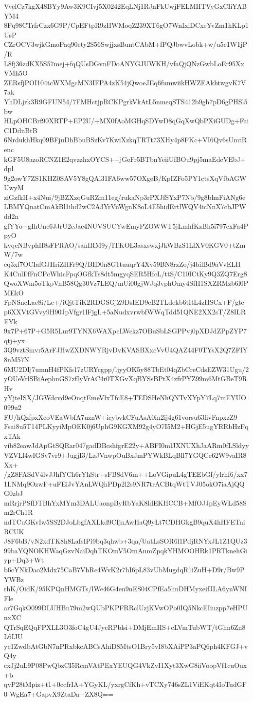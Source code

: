 VvelCz7kgX48BYy9Aw3K9CIvj5X0242EqLNj1RJnFkUwjFELMHTVyGxCIiYABYM4
8Fq98CTrfrCzx6G9P/CpEFtpR9zHWMoqZ239XT6gO7WnIxiDCxeYvZm1hKLp1UsP
CZrOCV3wjkGmoPaq90ety2S56SwjjxsBuntCAbM+fPQJbwvLobk+w/u5c1W1jP/R
L8fj36zdKX5S57mej+fqQUsDGvnFDoANYGJUWKH/vfaQjQNzGwbLoEr95XxVMh5O
ZERsfjPOI104tcWXMgcMN3IFPA4zK54jQwoeJEq6fumwiikHWZEAkhtwgvK7V7ak
YhDLjrk3R9GFUN54/7FMHctjpRCKPgrkVkAtL5nmeqSTS412b9gh7pD6gPHSl5bw
HLpOHCBrf90XRTP+EP2U/+MX0fAoMGHqSDYwD8qGqXwQbPXiGUDg+FaiC1DdnBtB
6NrdukhHkq09BFjuDhBbuBSzKv7KwiXzkqTRTt73XHy4p8FKc+VI6Qv6sUmtRenc
kGF5U8azoRCNZ1E2qvzzhxOYCS++jGeFr5BTbnYeiiUfBOu9pj5maEdcVEbJ+dpl
9g2owY7ZS1KHZ0SAV5Y8gQAl31FA6ww57OXgeB/KpIZFo5PY1ctsXqVfbAGWUwyM
ziGzfkH+x4Nui/9jBZXzqGuRZm11eg/rukaNp3rPXJfSYxP7Nb/9g8blmFiANg6e
LBMYQnatCmAkBl1ihd2wC2A3YrVnWgnK8oL4E5hidErtlWQV4icNnX7cbJPWdd2n
gfYYo+gIhUnc6JJrU2cJae4NUVSUCYwEmyPZOWWT5jLmhfKzBh5i797exFa4PpyO
kvqeNBvphH8sFPRAO/sanIRM9y/ITKOL3asxswxjJkWBzS1LlXV0KGV0+tZmW/7w
eq3xf7OCIafGJHriZHFr9Q/BID0n8G1tuuqrY4Xv59BN8rzZo/j4bilBd9aVvELH
K4CulFfFnCPcWhicFpqOGfkTs8dt5mgyqSER5HfcL/ttS/C10ICtKy9Q3ZQ7Erg8
QwoXWm5oTkpVnB58Qg30Vz7LEQ/mUi00gjWJq3vphOmy4SfH1SXZRMzb6l0PMEkO
FpNSncLae8i/Lc+/iQjtTiK2RDGSGjZ9DsIED9cB2TLdekb6tItL4zHSCx+F/gte
p6XXVtGVvy9H90JpVfgr1lFjgL+5aNudxvrwbfWWqTdd51QNE2XX2sT/Z8ILREYk
9x7P+67P+G5R5Lur9TYNX6WAXpcLWckz7OBuSbLSGPPvj0pXDJdZPpZYP7qtj+yx
3Q9vztSmvr5ArFJHwZXDNWYRjvDvKVASBXxcVvU4QAZ44F0TYsX2Q7ZFIY8nM57N
6MU2DIj7umnH4fPKfs17zURYcgpp/ljyyOK5y88TbEt04qZbCreCdsEZW31Ugu/2
yOUeVrlSBiAephnGS7zfIyVrAC4r0TXGvXqBYSsBPtX4zfrPYZ99m6MtGBeT9RHv
yYjteISX/JGWdcvd9eOnqtEmeVlxTfcE8+TEDSHeNhQNTvXYpY7Lq7mEYUO099u2
FU/hQzfpxXcoVEaWbfA7uznW+icybvkCFuAsA0in2ij4g61vorsu63fivFnpxzZ9
Fsai8u5T14PLKyyiMpOEK0j6UphG9KGXM92g4yO7I5M2+HGjE5ugYRRbHzFqxTAk
vib82eawJdApGtSQRar047gadDBcshfgrE22y+ABFI0mlJXNUXhJaARm0fLSldyy
VZVLl4wIGSv7vr9+JugjI3/LzJVnwpOuBxJmPYWkBLqBll7YGQCe62W9vaIR8Xx+
/gZ8FASdV4lvJJhfYCh6rYhStr+sFB8dV6m++LoVGipuL4gTEEbGf/ylrhf6/xx7
1LNMq9OzwF+uFEiJvYAnLWQhPDp2l2s9NR7trACBtqWtTVJ05okO7iaAjQQG0zbJ
mRrjrPSfDTBhYxMYm3DALUaonpByRbYaK8ldEKHCCB+MfOJJpEyWLd58Sm2rCh1R
ndTCuGKvIw5SS2DJoLbgfAXLkd9CIjnAwHaQ9yLt7CDHGkgB9quX4hHFETniRCUK
J8F6bB/vN2xdTK8h8LafsIPi9bq3qhwb+3qa/UatLsSOR6l1PdjRNYxJL1Z1QUz3
99baYQNOKHWaqGzvNaiDqhTKOmV5OmAnmZpqkYHMOOHRk1PRTknehGiyp+Dq3+Wt
b6cYNkDao2Mdx75CaB7VhRc4WvK2r7hI6pL83vUbMugdqR1iZuH+D9r/Bw9PYWBz
rhK/OidK/95KPQnHMGTs/lWe46G4en9nES04CPfEa5hnDHMyxeifJLA6ynWNIFle
ar7GqkO099DLUHBn79m2wQUbPKPFRRclUzjKVwOPo0IQ5NkcEIiuzpp7eHPUnxXC
QTrSqEQqFPXLL3O3foC4gU4JycRPblsi+DMjEmHS+cLVmTubWT/tGhn6Zn8L6IJU
yc1ZwdbAtGbN7nPRxbkcABCsAhiD8MtsO1Bry5vI8bXAiPP3aPQ6ph4KFGJ+vQ4y
cxJj2uL9P08PwQbzCI5RcmVAtPExYEUQG4VkZvI1Xyt3XwG8iiVoopVf1cuOux+b
qvP28tMpiz+t1+0ccfrIA+YGyKL/yxrgCfKh+vTCXy746sZL1ViEKqt4IoTudGF0
WgEa7+GapvX9ZtaDa+ZX8Q==
